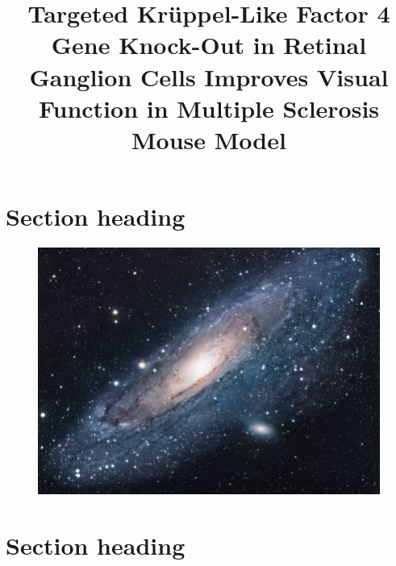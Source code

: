 \documentclass{eNeuroArticle}
\title{Targeted Krüppel-Like Factor 4 Gene Knock-Out in
Retinal Ganglion Cells Improves Visual Function in
Multiple Sclerosis Mouse Model}
\author{}
\date{}
\begin{document}
\maketitle

\begin{abstract}
\blindtext\blindtext
\end{abstract}

\section{Section heading}
\Blindtext[10]

\begin{figure}[th]
  \centering
  \includegraphics[width=\textwidth]{universe}
  \caption{\blindtext}
  \label{fig:universe}
\end{figure}

\section{Section heading}
\Blindtext[20]
\end{document}
